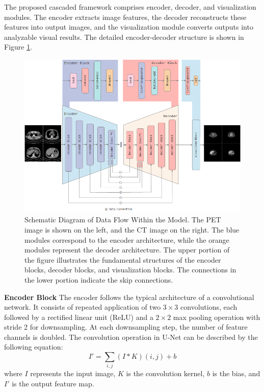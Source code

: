 \documentclass[a4paper, times, 10pt,twocolumn]{article}
\begin{document}
The proposed cascaded framework comprises encoder, decoder, and visualization modules. The encoder extracts image features, the decoder reconstructs these features into output images, and the visualization module converts outputs into analyzable visual results. The detailed encoder-decoder structure is shown in Figure \ref{fig:Encoder_Decoder_Pair}.

\begin{figure}[t!]
	\centering
	\includegraphics[width=1.0\linewidth]{u-net/lung/Encoder-Decoder-5layer-250406}
	\caption[architecture]{Schematic Diagram of Data Flow Within the Model. The PET image is shown on the left, and the CT image on the right. The blue modules correspond to the encoder architecture, while the orange modules represent the decoder architecture. The upper portion of the figure illustrates the fundamental structures of the encoder blocks, decoder blocks, and visualization blocks. The connections in the lower portion indicate the skip connections.}
	\label{fig:Encoder_Decoder_Pair}
\end{figure}

\textbf{Encoder Block} The encoder follows the typical architecture of a convolutional network. It consists of repeated application of two $3\times3$ convolutions, each followed by a rectified linear unit (ReLU) and a $2\times2$ max pooling operation \cite{murray_generalized_2014} with stride 2 for downsampling. At each downsampling step, the number of feature channels is doubled. The convolution operation in U-Net can be described by the following equation:
\[
	I' = \sum_{i,j} (I * K)(i,j) + b
\]
where \(I\) represents the input image, \(K\) is the convolution kernel, \(b\) is the bias, and \(I'\) is the output feature map.
\end{document}
